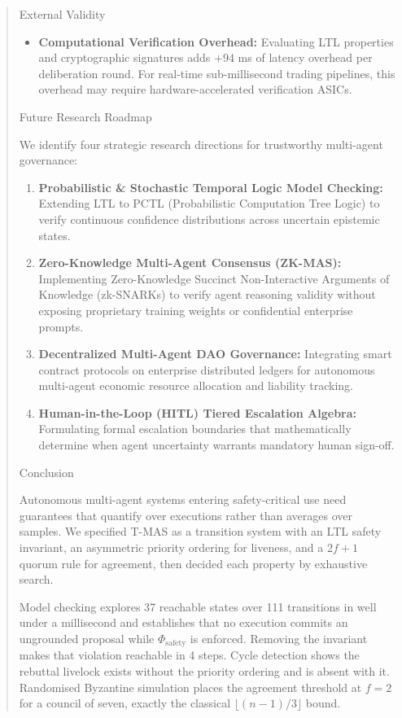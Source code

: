 \documentclass[10pt,journal,compsoc,twocolumn]{IEEEtran}
\begin{document}
\begin{quote}
{ External Validity
\begin{itemize}
  \item \textbf{Computational Verification Overhead:} Evaluating LTL properties and cryptographic signatures adds $+94$ ms of latency overhead per deliberation round. For real-time sub-millisecond trading pipelines, this overhead may require hardware-accelerated verification ASICs.
\end{itemize}



 Future Research Roadmap

We identify four strategic research directions for trustworthy multi-agent governance:
\begin{enumerate}
  \item \textbf{Probabilistic \& Stochastic Temporal Logic Model Checking:} Extending LTL to PCTL (Probabilistic Computation Tree Logic) to verify continuous confidence distributions across uncertain epistemic states.
  \item \textbf{Zero-Knowledge Multi-Agent Consensus (ZK-MAS):} Implementing Zero-Knowledge Succinct Non-Interactive Arguments of Knowledge (zk-SNARKs) to verify agent reasoning validity without exposing proprietary training weights or confidential enterprise prompts.
  \item \textbf{Decentralized Multi-Agent DAO Governance:} Integrating smart contract protocols on enterprise distributed ledgers for autonomous multi-agent economic resource allocation and liability tracking.
  \item \textbf{Human-in-the-Loop (HITL) Tiered Escalation Algebra:} Formulating formal escalation boundaries that mathematically determine when agent uncertainty warrants mandatory human sign-off.
\end{enumerate}



 Conclusion

Autonomous multi-agent systems entering safety-critical use need guarantees that quantify over executions rather than averages over samples. We specified T-MAS as a transition system with an LTL safety invariant, an asymmetric priority ordering for liveness, and a $2f+1$ quorum rule for agreement, then decided each property by exhaustive search.

Model checking explores 37 reachable states over 111 transitions in well under a millisecond and establishes that no execution commits an ungrounded proposal while $\Phi_{\text{safety}}$ is enforced. Removing the invariant makes that violation reachable in 4 steps. Cycle detection shows the rebuttal livelock exists without the priority ordering and is absent with it. Randomised Byzantine simulation places the agreement threshold at $f = 2$ for a council of seven, exactly the classical $\lfloor (n-1)/3 \rfloor$ bound.

}
\end{quote}
\end{document}
